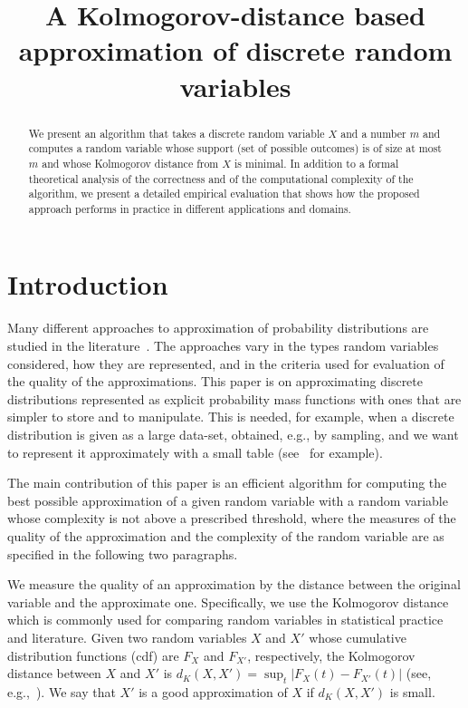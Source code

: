 \documentclass{article}
\title{A Kolmogorov-distance based approximation of discrete random variables}
\begin{document}
	
	
	\maketitle
	\begin{abstract}
		We present an algorithm that takes a discrete random variable $X$ and a number $m$ and computes a random variable whose support (set of possible outcomes) is of size at most $m$ and whose Kolmogorov distance from $X$ is minimal. In addition to a formal theoretical analysis of the correctness and of the computational complexity of the algorithm, we present a detailed empirical evaluation that shows how the proposed approach performs in practice in different applications and domains.
	\end{abstract}
	
	
	\section{Introduction}
	
	Many different approaches to approximation of probability distributions are studied in the literature~\cite{AMCR83,pavlikov2016cvar,PS77}. 
	The approaches vary in the types random variables considered, how they are represented, and in the criteria used for evaluation of the quality of the approximations. This paper is on approximating discrete distributions represented as explicit probability mass functions with ones that are simpler to store and to manipulate. This is needed, for example, when a discrete distribution is given as a large data-set, obtained, e.g., by sampling, and we want to represent it approximately with a small table (see~\cite{huq2016efficient} for example).  
	
	The main contribution of this paper is an efficient algorithm for computing the best possible approximation of a given random variable with a random variable whose complexity is not above a prescribed threshold, where the measures of the quality of the approximation and the complexity of the random variable are as specified in the following two paragraphs. 
	
	We measure the quality of an approximation by the distance between the original variable and the approximate one. Specifically, we use the Kolmogorov distance which is  commonly used for comparing random variables in statistical practice and literature. Given two random variables $X$ and $X'$ whose cumulative distribution functions (cdf) are $F_X$ and $F_{X'}$, respectively, the Kolmogorov distance between $X$ and $X'$ is $d_K(X,X')= \sup_t |F_X(t) - F_{X'}(t)|$ (see, e.g.,~\cite{gibbons2011nonparametric}). We say that $X'$ is a good approximation of $X$ if $d_K(X,X')$ is small.
	
\end{document}
